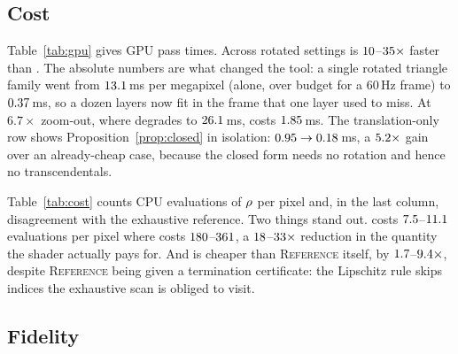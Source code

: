 \subsection{Cost}




Table~\ref{tab:gpu} gives GPU pass times. Across rotated settings \ours{} is
$10$--$35\times$ faster than \sweep{}. The absolute numbers are
what changed the tool: a single rotated triangle family went from
$13.1$\,ms per megapixel (alone, over budget for a $60$\,Hz frame)
to $0.37$\,ms, so a dozen layers now fit in the frame that one layer
used to miss. At $6.7\times$ zoom-out, where \sweep{} degrades to
$26.1$\,ms, \ours{} costs $1.85$\,ms. The
translation-only row shows Proposition~\ref{prop:closed} in isolation:
$0.95 \to 0.18$\,ms, a $5.2\times$ gain over
an already-cheap case, because the closed form needs no rotation and hence no
transcendentals.

Table~\ref{tab:cost} counts CPU evaluations of $\rho$ per pixel and, in the last
column, disagreement with the exhaustive reference. Two things stand out. \ours{}
costs $7.5$--$11.1$ evaluations per pixel where \sweep{} costs
$180$--$361$, a $18$--$33\times$
reduction in the quantity the shader actually pays for. And \ours{} is cheaper than
\textsc{Reference} itself, by $1.7$--$9.4\times$, despite
\textsc{Reference} being given a termination
certificate: the Lipschitz rule skips indices the exhaustive scan is obliged to
visit.

\subsection{Fidelity}

